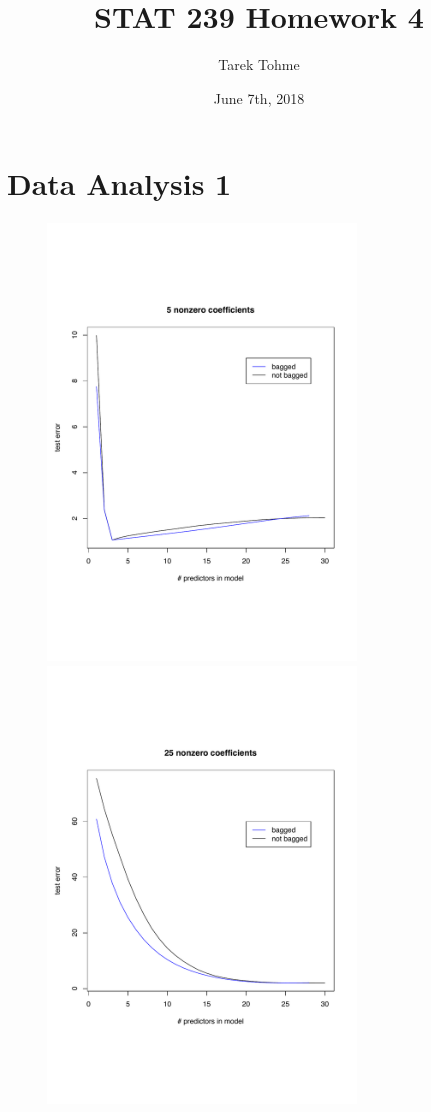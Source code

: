 \documentclass{article}
\begin{document}
\title{STAT 239 Homework 4}
\author{Tarek Tohme}
\date{June 7th, 2018}
\maketitle

\section*{Data Analysis 1}

\paragraph{}
\begin{figure}[h]				%
	\centering
	\includegraphics[width=8.2cm]{DA1/5.pdf}
	\includegraphics[width=8.2cm]{DA1/25.pdf}
	\caption{}
\end{figure}
\end{document}
